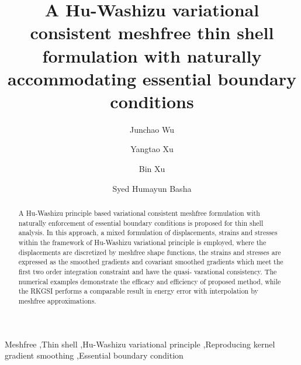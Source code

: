 
\begin{frontmatter}
    \title{A Hu-Washizu variational consistent meshfree thin shell formulation with naturally accommodating essential boundary conditions}
    \author[1]{Junchao Wu}
    \author[2]{Yangtao Xu}
    \author[1]{Bin Xu}
    \author[3]{Syed Humayun Basha}





\begin{abstract}
A Hu-Washizu principle based variational consistent meshfree formulation with naturally enforcement of essential boundary conditions is proposed for thin shell analysis. In this approach, a mixed formulation of displacements, strains and stresses within the framework of Hu-Washizu variational principle is employed, where the displacements are discretized by meshfree shape functions, the strains and stresses are expressed as the smoothed gradients and covariant smoothed gradients which meet the first two order integration constraint and have the quasi- varational consistency. 
The numerical examples demonstrate the efficacy and efficiency of proposed method, while the RKGSI performs a comparable result in energy error with interpolation by meshfree approximations.
\end{abstract}
\begin{keyword}
Meshfree \sep Thin shell \sep Hu-Washizu variational principle \sep Reproducing kernel gradient smoothing \sep Essential boundary condition
\end{keyword}
\end{frontmatter}
